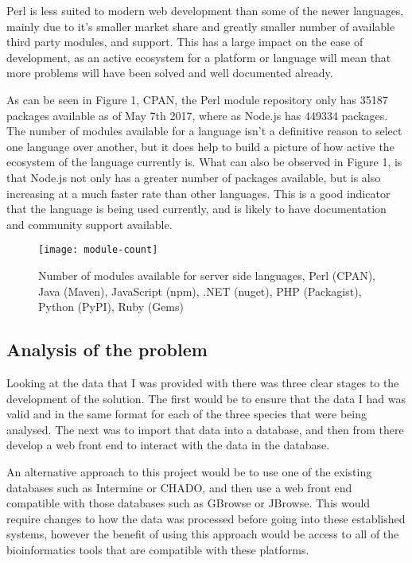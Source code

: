 Perl is less suited to modern web development than some of the newer languages, mainly due to it's smaller market share\cite{perl-market} and greatly smaller number of available third party modules, and support. This has a large impact on the ease of development, as an active ecosystem for a platform or language will mean that more problems will have been solved and well documented already.

As can be seen in Figure 1, CPAN, the Perl module repository only has 35187 packages available as of May 7th 2017, where as Node.js has 449334 packages. The number of modules available for a language isn't a definitive reason to select one language over another, but it does help to build a picture of how active the ecosystem of the language currently is. What can also be observed in Figure 1, is that Node.js not only has a greater number of packages available, but is also increasing at a much faster rate than other languages. This is a good indicator that the language is being used currently, and is likely to have documentation and community support available.

\begin{figure}[ht!]
\begin{center}
\texttt{[image: module-count]}
\caption{Number of modules available for server side languages, Perl (CPAN), Java (Maven), JavaScript (npm), .NET (nuget), PHP (Packagist), Python (PyPI), Ruby (Gems)\cite{modulecounts}}
\end{center}
\end{figure}

\subsection{Analysis of the problem}
Looking at the data that I was provided with there was three clear stages to the development of the solution. The first would be to ensure that the data I had was valid and in the same format for each of the three species that were being analysed. The next was to import that data into a database, and then from there develop a web front end to interact with the data in the database. 

An alternative approach to this project would be to use one of the existing databases such as Intermine\cite{intermine} or CHADO\cite{chado}, and then use a web front end compatible with those databases such as GBrowse\cite{gbrowse} or JBrowse\cite{jbrowse}. This would require changes to how the data was processed before going into these established systems, however the benefit of using this approach would be access to all of the bioinformatics tools that are compatible with these platforms.

